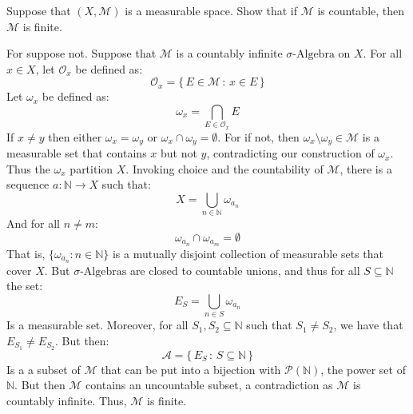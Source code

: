 \documentclass[crop=false,class=article]{standalone}                           %
\begin{document}
    \begin{problem}
        Suppose that $(X,\mathcal{M})$ is a measurable space. Show that if
        $\mathcal{M}$ is countable, then $\mathcal{M}$ is finite.
    \end{problem}
    \begin{solution}
        For suppose not. Suppose that $\mathcal{M}$ is a countably infinite
        $\sigma\textrm{-Algebra}$ on $X$. For all $x\in{X}$, let
        $\mathcal{O}_{x}$ be defined as:
        \begin{equation}
            \mathcal{O}_{x}=\big\{\,E\in\mathcal{M}\,:\,x\in{E}\,\}
        \end{equation}
        Let $\omega_{x}$ be defined as:
        \begin{equation}
            \omega_{x}=\bigcap_{E\in\mathcal{O}_{x}}E
        \end{equation}
        If $x\ne{y}$ then either $\omega_{x}=\omega_{y}$ or
        $\omega_{x}\cap\omega_{y}=\emptyset$. For if not, then
        $\omega_{x}\setminus\omega_{y}\in\mathcal{M}$ is a measurable set that
        contains $x$ but not $y$, contradicting our construction of
        $\omega_{x}$. Thus the $\omega_{x}$ partition $X$. Invoking choice and
        the countability of $\mathcal{M}$, there is a sequence
        $a:\mathbb{N}\rightarrow{X}$ such that:
        \begin{equation}
            X=\bigcup_{n\in\mathbb{N}}\omega_{a_{n}}
        \end{equation}
        And for all $n\ne{m}$:
        \begin{equation}
            \omega_{a_{n}}\cap\omega_{a_{m}}=\emptyset
        \end{equation}
        That is, $\{\omega_{a_{n}}:n\in\mathbb{N}\}$ is a mutually disjoint
        collection of measurable sets that cover $X$. But
        $\sigma\textrm{-Algebras}$ are closed to countable unions, and thus for
        all $S\subseteq\mathbb{N}$ the set:
        \begin{equation}
            E_{S}=\bigcup_{n\in{S}}\omega_{a_{n}}
        \end{equation}
        Is a measurable set. Moreover, for all $S_{1},S_{2}\subseteq\mathbb{N}$
        such that $S_{1}\ne{S}_{2}$, we have that $E_{S_{1}}\ne{E}_{{S}_{2}}$.
        But then:
        \begin{equation}
            \mathcal{A}=\big\{\,E_{S}\,:\,S\subseteq\mathbb{N}\,\}
        \end{equation}
        Is a a subset of $\mathcal{M}$ that can be put into a bijection with
        $\mathcal{P}(\mathbb{N})$, the power set of $\mathbb{N}$. But then
        $\mathcal{M}$ contains an uncountable subset, a contradiction as
        $\mathcal{M}$ is countably infinite. Thus, $\mathcal{M}$ is finite.
    \end{solution}
\end{document}
